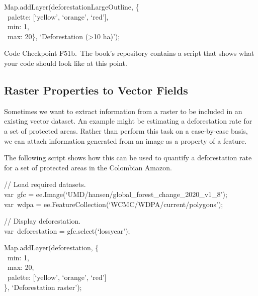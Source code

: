 \documentclass[
  letterpaper,
  DIV=11,
  numbers=noendperiod]{scrreprt}
\begin{document}
Map.addLayer(deforestationLargeOutline, \{\\
\hspace*{0.333em} ~palette: {[}`yellow', `orange', `red'{]},\\
\hspace*{0.333em} ~min: 1,\\
\hspace*{0.333em} ~max: 20\}, `Deforestation (\textgreater10 ha)');

\begin{tcolorbox}[enhanced jigsaw, left=2mm, breakable, rightrule=.15mm, opacityback=0, colframe=quarto-callout-note-color-frame, colbacktitle=quarto-callout-note-color!10!white, arc=.35mm, opacitybacktitle=0.6, toptitle=1mm, colback=white, leftrule=.75mm, title=\textcolor{quarto-callout-note-color}{\faInfo}\hspace{0.5em}{Note}, toprule=.15mm, bottomtitle=1mm, titlerule=0mm, bottomrule=.15mm, coltitle=black]

Code Checkpoint F51b.~The book's repository contains a script that shows
what your code should look like at this point.

\end{tcolorbox}

\hypertarget{raster-properties-to-vector-fields}{%
\subsection{Raster Properties to Vector
Fields}\label{raster-properties-to-vector-fields}}

Sometimes we want to extract information from a raster to be included in
an existing vector dataset. An example might be estimating a
deforestation rate for a set of protected areas. Rather than perform
this task on a case-by-case basis, we can attach information generated
from an image as a property of a feature.

The following script shows how this can be used to quantify a
deforestation rate for a set of protected areas in the Colombian Amazon.

// Load required datasets.\\
var~gfc = ee.Image(`UMD/hansen/global\_forest\_change\_2020\_v1\_8');\\
var~wdpa = ee.FeatureCollection(`WCMC/WDPA/current/polygons');

// Display deforestation.\\
var~deforestation = gfc.select(`lossyear');

Map.addLayer(deforestation, \{\\
\hspace*{0.333em} ~min: 1,\\
\hspace*{0.333em} ~max: 20,\\
\hspace*{0.333em} ~palette: {[}`yellow', `orange', `red'{]}\\
\}, `Deforestation raster');
\end{document}
